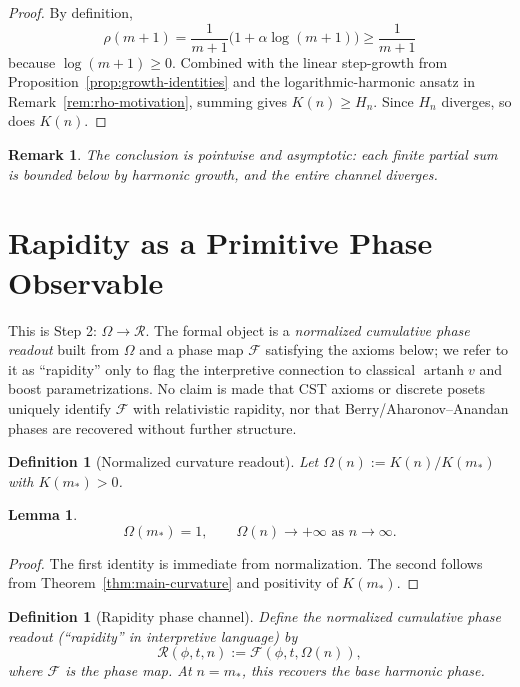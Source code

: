 \documentclass[11pt]{amsart}
\newtheorem{lemma}[theorem]{Lemma}
\newtheorem{definition}[theorem]{Definition}
\newtheorem{remark}[theorem]{Remark}
\begin{document}
\begin{proof}
By definition,
\[
\rho(m+1)=\frac1{m+1}\bigl(1+\alpha\log(m+1)\bigr)\ge \frac1{m+1}
\]
because $\log(m+1)\ge 0$. Combined with the linear step-growth from Proposition~\ref{prop:growth-identities} and the logarithmic-harmonic ansatz in Remark~\ref{rem:rho-motivation}, summing gives $K(n)\ge H_n$.
Since $H_n$ diverges, so does $K(n)$.
\end{proof}

\begin{remark}
The conclusion is pointwise and asymptotic: each finite partial sum is bounded below by harmonic growth, and the entire channel diverges.
\end{remark}

\section{Rapidity as a Primitive Phase Observable}
\label{sec:rapidity}
This is Step 2: \(\Omega\to\mathcal R\). The formal object is a \emph{normalized cumulative phase readout} built from \(\Omega\) and a phase map \(\mathcal F\) satisfying the axioms below; we refer to it as ``rapidity'' only to flag the interpretive connection to classical \(\operatorname{artanh}v\) and boost parametrizations. No claim is made that CST axioms or discrete posets uniquely identify \(\mathcal{F}\) with relativistic rapidity, nor that Berry/Aharonov--Anandan phases are recovered without further structure.

\begin{definition}[Normalized curvature readout]
Let $\Omega(n):=K(n)/K(m_\ast)$ with $K(m_\ast)>0$.
\end{definition}

\begin{lemma}
\[
\Omega(m_\ast)=1,\qquad \Omega(n)\to +\infty \text{ as } n\to\infty.
\]
\end{lemma}

\begin{proof}
The first identity is immediate from normalization. The second follows from
Theorem~\ref{thm:main-curvature} and positivity of $K(m_\ast)$.
\end{proof}

\begin{definition}[Rapidity phase channel]
Define the \emph{normalized cumulative phase readout} (``rapidity'' in interpretive language) by
\[
\mathcal R(\phi,t,n):=\mathcal F(\phi,t,\Omega(n)),
\]
where $\mathcal F$ is the phase map. At $n=m_\ast$, this recovers the base harmonic phase.
\end{definition}
\end{document}
